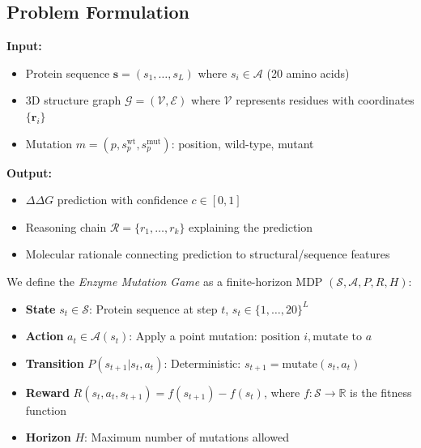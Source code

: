 \documentclass[11pt]{article}
\newcommand{\ddG}{\Delta\Delta G}
\begin{document}
\subsection{Problem Formulation}

\textbf{Input:} 
\begin{itemize}

    \item Protein sequence $\mathbf{s} = (s_1, \ldots, s_L)$ where $s_i \in
        \mathcal{A}$ (20 amino acids)

    \item 3D structure graph $\mathcal{G} = (\mathcal{V}, \mathcal{E})$ where
        $\mathcal{V}$ represents residues with coordinates $\{\mathbf{r}_i\}$

    \item Mutation $m = (p, s_p^{\text{wt}}, s_p^{\text{mut}})$: position,
wild-type, mutant \end{itemize}

\textbf{Output:} 
\begin{itemize}
    \item $\ddG$ prediction with confidence $c \in [0,1]$
    \item Reasoning chain $\mathcal{R} = \{r_1, \ldots, r_k\}$ explaining the prediction
    \item Molecular rationale connecting prediction to structural/sequence features
\end{itemize}

We define the \textit{Enzyme Mutation Game} as a finite-horizon MDP
$(\mathcal{S}, \mathcal{A}, P, R, H)$:

\begin{itemize}
\item \textbf{State} $s_t \in \mathcal{S}$: Protein sequence at step $t$, $s_t
    \in \{1,\dots,20\}^L$

  \item \textbf{Action} $a_t \in \mathcal{A}(s_t)$: Apply a point mutation:
      $\text{position } i, \text{mutate to } a$

  \item \textbf{Transition} $P(s_{t+1}|s_t,a_t)$: Deterministic: $s_{t+1} =
      \text{mutate}(s_t, a_t)$

  \item \textbf{Reward} $R(s_t,a_t,s_{t+1}) = f(s_{t+1}) - f(s_t)$, where
      $f:\mathcal{S}\to\mathbb{R}$ is the fitness function

  \item \textbf{Horizon} $H$: Maximum number of mutations allowed

\end{itemize}
\end{document}
